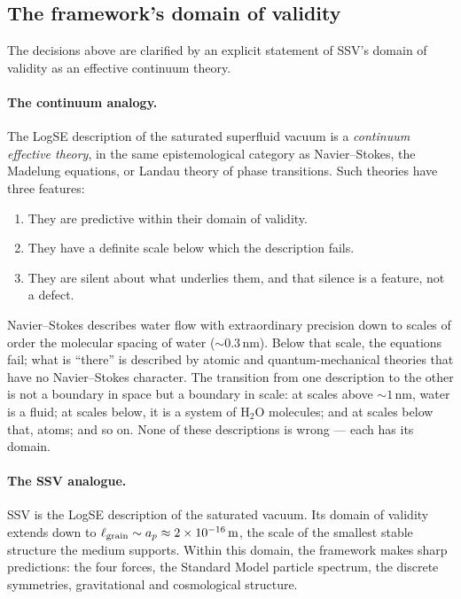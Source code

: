 \documentclass[11pt,a4paper]{article}
\begin{document}
\subsection{The framework's domain of validity}
\label{sec:domain}

The decisions above are clarified by an explicit statement of SSV's
domain of validity as an effective continuum theory.

\paragraph{The continuum analogy.}
The LogSE description of the saturated superfluid vacuum is a
\emph{continuum effective theory}, in the same epistemological category
as Navier--Stokes, the Madelung equations, or Landau theory of phase
transitions.  Such theories have three features:
\begin{enumerate}
\item They are predictive within their domain of validity.
\item They have a definite scale below which the description fails.
\item They are silent about what underlies them, and that silence is a
      feature, not a defect.
\end{enumerate}
Navier--Stokes describes water flow with extraordinary precision down
to scales of order the molecular spacing of water ($\sim 0.3\,$nm).
Below that scale, the equations fail; what is ``there'' is described
by atomic and quantum-mechanical theories that have no Navier--Stokes
character.  The transition from one description to the other is not a
boundary in space but a boundary in scale: at scales above
$\sim 1\,$nm, water is a fluid; at scales below, it is a system of
H$_2$O molecules; and at scales below that, atoms; and so on.  None of
these descriptions is wrong --- each has its domain.

\paragraph{The SSV analogue.}
SSV is the LogSE description of the saturated vacuum.  Its domain of
validity extends down to $\ell_{\rm grain} \sim a_p \approx 2\times
10^{-16}\,\mathrm{m}$, the scale of the smallest stable structure the
medium supports.  Within this domain, the framework makes sharp
predictions: the four forces, the Standard Model particle spectrum,
the discrete symmetries, gravitational and cosmological structure.
\end{document}
